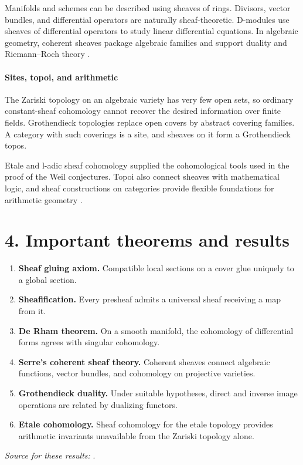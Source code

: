 Manifolds and schemes can be described using sheaves of rings. Divisors, vector bundles, and differential operators are naturally sheaf-theoretic. D-modules use sheaves of differential operators to study linear differential equations. In algebraic geometry, coherent sheaves package algebraic families and support duality and Riemann--Roch theory \cite{sheaf_ref4}.

\paragraph{Sites, topoi, and arithmetic}
The Zariski topology on an algebraic variety has very few open sets, so ordinary constant-sheaf cohomology cannot recover the desired information over finite fields. Grothendieck topologies replace open covers by abstract covering families. A category with such coverings is a site, and sheaves on it form a Grothendieck topos.

Etale and l-adic sheaf cohomology supplied the cohomological tools used in the proof of the Weil conjectures. Topoi also connect sheaves with mathematical logic, and sheaf constructions on categories provide flexible foundations for arithmetic geometry \cite{sheaf_ref2}.

\section*{4. Important theorems and results}
\begin{enumerate}[leftmargin=*,itemsep=0.35em]
\item \textbf{Sheaf gluing axiom.} Compatible local sections on a cover glue uniquely to a global section.

\item \textbf{Sheafification.} Every presheaf admits a universal sheaf receiving a map from it.

\item \textbf{De Rham theorem.} On a smooth manifold, the cohomology of differential forms agrees with singular cohomology.

\item \textbf{Serre's coherent sheaf theory.} Coherent sheaves connect algebraic functions, vector bundles, and cohomology on projective varieties.

\item \textbf{Grothendieck duality.} Under suitable hypotheses, direct and inverse image operations are related by dualizing functors.

\item \textbf{Etale cohomology.} Sheaf cohomology for the etale topology provides arithmetic invariants unavailable from the Zariski topology alone.
\end{enumerate}
\noindent\emph{Source for these results:} \cite{sheaf_ref1}.

